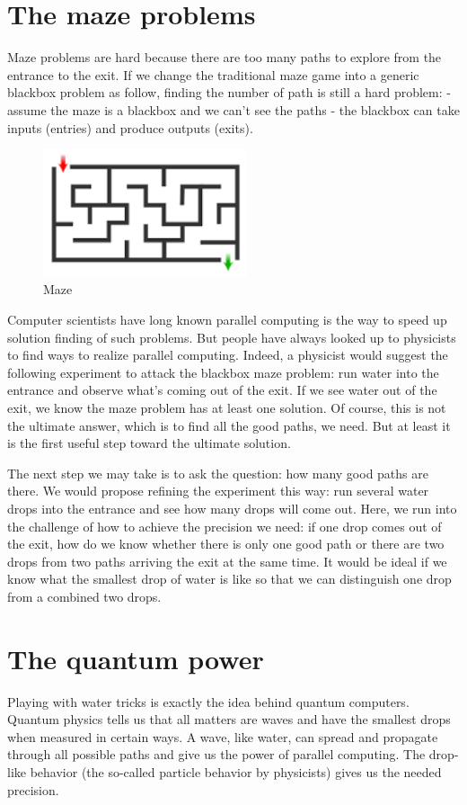 \documentclass{book}
\begin{document}
\section{The maze problems}
Maze problems are hard because there are too many paths to explore from the entrance to the exit. If we change the traditional maze game into a generic blackbox problem as follow, finding the number of path is still a hard problem:
- assume the maze is a blackbox and we can't see the paths
- the blackbox can take inputs (entries) and produce outputs (exits).

\begin{figure}[ht]
\includegraphics[width=6cm]{pic/maze.png}
\caption{Maze}
\label{Maze}
\end{figure}

Computer scientists have long known parallel computing is the way to speed up solution finding of such problems. But people have always looked up to physicists to find ways to realize parallel computing. Indeed, a physicist would suggest the following experiment to attack the blackbox maze problem: run water into the entrance and observe what's coming out of the exit. If we see water out of the exit, we know the maze problem has at least one solution. Of course, this is not the ultimate answer, which is to find all the good paths, we need. But at least it is the first useful step toward the ultimate solution.

The next step we may take is to ask the question: how many good paths are there. We would propose refining the experiment this way: run several water drops into the entrance and see how many drops will come out. Here, we run into the challenge of how to achieve the precision we need: if one drop comes out of the exit, how do we know whether there is only one good path or there are two drops from two paths arriving the exit at the same time. It would be ideal if we know what the smallest drop of water is like so that we can distinguish one drop from a combined two drops.

\section{The quantum power}
Playing with water tricks is exactly the idea behind quantum computers. Quantum physics tells us that all matters are waves and have the smallest drops when measured in certain ways. A wave, like water, can spread and propagate through all possible paths and give us the power of parallel computing. The drop-like behavior (the so-called particle behavior by physicists) gives us the needed precision.
\end{document}
